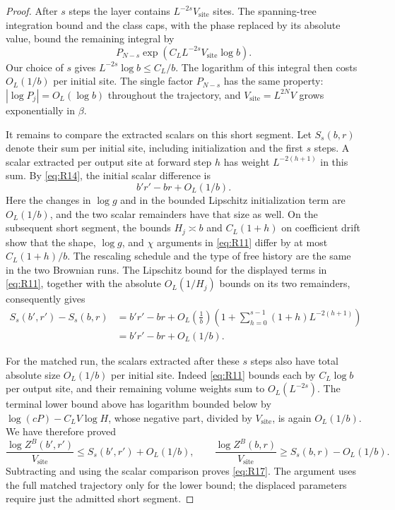 \begin{proof}
After $s$ steps the layer contains $L^{-2s}V_{\mathrm{site}}$ sites.
The spanning-tree integration bound and the class caps, with the phase
replaced by its absolute value, bound the remaining integral by
\[
  P_{N-s}\exp\!\left(
       C_L L^{-2s}V_{\mathrm{site}}\log b\right).
\]
Our choice of $s$ gives $L^{-2s}\log b\le C_L/b$.
The logarithm of this integral then costs
$O_L(1/b)$ per initial site.  The single factor $P_{N-s}$ has the same
property: $|\log P_j|=O_L(\log b)$ throughout the trajectory, and
$V_{\mathrm{site}}=L^{2N}V$ grows exponentially in $\beta$.

It remains to compare the extracted scalars on this short segment.
Let $S_s(b,r)$ denote their sum per initial site, including initialization
and the first $s$ steps.  A scalar extracted per output site at forward
step $h$ has weight $L^{-2(h+1)}$ in this sum.  By \eqref{eq:R14}, the
initial scalar difference is
\[
  b'r'-br+O_L(1/b).
\]
Here the changes in $\log g$ and in the bounded Lipschitz initialization
term are $O_L(1/b)$, and the two scalar remainders have that size as well.
On the subsequent short segment, the bounds $H_j\asymp b$ and
$C_L(1+h)$ on coefficient drift show that the shape, $\log g$, and
$\chi$ arguments in \eqref{eq:R11} differ by at most
$C_L(1+h)/b$.  The rescaling schedule and the type of free history are
the same in the two Brownian runs.  The Lipschitz bound for the displayed
terms in \eqref{eq:R11}, together with the absolute $O_L(1/H_j)$ bounds
on its two remainders, consequently gives
\begin{align*}
  S_s(b',r')-S_s(b,r)
  &=b'r'-br+
     O_L\!\left(\frac1b\right)
       \left(1+\sum_{h=0}^{s-1}(1+h)L^{-2(h+1)}\right)\\
  &=b'r'-br+O_L(1/b).
\end{align*}

For the matched run, the scalars extracted after these $s$ steps also
have total absolute size $O_L(1/b)$ per initial site.  Indeed
\eqref{eq:R11} bounds each by $C_L\log b$ per output site, and their
remaining volume weights sum to $O_L(L^{-2s})$.
The terminal lower bound above has logarithm bounded below by
$\log(cP)-C_LV\log H$, whose negative part, divided by
$V_{\mathrm{site}}$, is again $O_L(1/b)$.  We have therefore proved
\[
  \frac{\log Z^B(b',r')}{V_{\mathrm{site}}}
       \le S_s(b',r')+O_L(1/b),\qquad
  \frac{\log Z^B(b,r)}{V_{\mathrm{site}}}
       \ge S_s(b,r)-O_L(1/b).
\]
Subtracting and using the scalar comparison proves \eqref{eq:R17}.
The argument uses the full matched trajectory only for the lower bound;
the displaced parameters require just the admitted short segment.
\end{proof}
